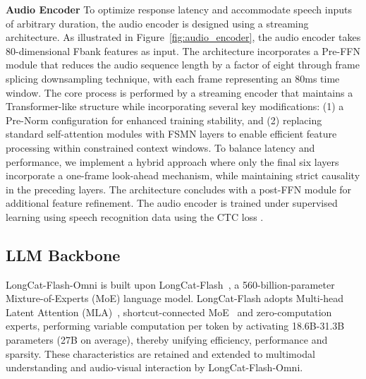 \documentclass{article}
\newcommand{\longcat}{LongCat-Flash-Omni\xspace}
\begin{document}
\textbf{Audio Encoder}
\label{audio_encoder}
To optimize response latency and accommodate speech inputs of arbitrary duration, the audio encoder is designed using a streaming architecture.
As illustrated in Figure~\ref{fig:audio_encoder}, the audio encoder takes 80-dimensional Fbank features as input. The architecture incorporates a Pre-FFN module that reduces the audio sequence length by a factor of eight through frame splicing downsampling technique, with each frame representing an 80ms time window.
The core process is performed by a streaming encoder that maintains a Transformer-like structure while incorporating several key modifications: (1) a Pre-Norm configuration for enhanced training stability, and (2) replacing standard self-attention modules with FSMN layers \citep{zhang2018deep} to enable efficient feature processing within constrained context windows. 
To balance latency and performance, we implement a hybrid approach where only the final six layers incorporate a one-frame look-ahead mechanism, while maintaining strict causality in the preceding layers.
The architecture concludes with a post-FFN module for additional feature refinement. 
The audio encoder is trained under supervised learning using speech recognition data using the CTC loss \citep{graves2006connectionist}.

\subsection{LLM Backbone} %
LongCat-Flash-Omni is built upon LongCat-Flash~\citep{meituan2025longcat_flash_chat}, a 560-billion-parameter Mixture-of-Experts (MoE) language model.
LongCat-Flash adopts Multi-head Latent Attention (MLA)~\citep{liu2024deepseek}, shortcut-connected MoE~\citep{cai2024shortcut} and zero-computation experts, performing variable computation per token by activating 18.6B-31.3B parameters (27B on average), thereby unifying efficiency, performance and sparsity.
These characteristics are retained and extended to multimodal understanding and audio-visual interaction by \longcat.
\end{document}
